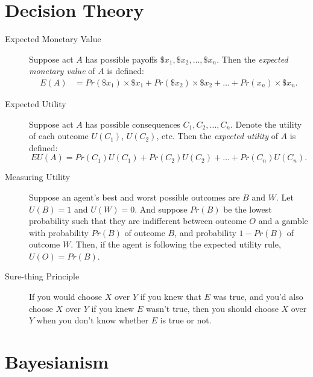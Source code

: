 \documentclass[justified]{tufte-book}
\renewcommand{\u}{U}
\newcommand{\p}{Pr}
\newcommand{\E}{E}
\newcommand{\EU}{EU}
\theoremstyle{definition}
\theoremstyle{definition}
\theoremstyle{definition}
\theoremstyle{remark}
\begin{document}
\hypertarget{decision-theory}{%
\section*{Decision Theory}\label{decision-theory}}

\begin{description}
\item[Expected Monetary Value]
Suppose act \(A\) has possible payoffs \(\$x_1, \$x_2, \ldots, \$x_n\).
Then the \emph{expected monetary value} of \(A\) is defined: \[
  \begin{aligned}
\E(A) &= \p(\$x_1) \times \$x_1 + \p(\$x_2) \times \$x_2 + \ldots + \p(x_n) \times \$x_n.
  \end{aligned}
\]
\item[Expected Utility]
Suppose act \(A\) has possible consequences \(C_1, C_2, \ldots,C_n\).
Denote the utility of each outcome \(U(C_1)\), \(U(C_2)\), etc. Then the
\emph{expected utility} of \(A\) is defined:
\[ \EU(A) = \p(C_1)\u(C_1) + \p(C_2)\u(C_2) + \ldots + \p(C_n)\u(C_n). \]
\item[Measuring Utility]
Suppose an agent's best and worst possible outcomes are \(B\) and \(W\).
Let \(\u(B) = 1\) and \(\u(W) = 0\). And suppose \(\p(B)\) be the lowest
probability such that they are indifferent between outcome \(O\) and a
gamble with probability \(\p(B)\) of outcome \(B\), and probability
\(1 - \p(B)\) of outcome \(W\). Then, if the agent is following the
expected utility rule, \(\u(O) = \p(B)\).
\item[Sure-thing Principle]
If you would choose \(X\) over \(Y\) if you knew that \(E\) was true,
and you'd also choose \(X\) over \(Y\) if you knew \(E\) wasn't true,
then you should choose \(X\) over \(Y\) when you don't know whether
\(E\) is true or not.
\end{description}

\hypertarget{bayesianism-1}{%
\section*{Bayesianism}\label{bayesianism-1}}
\end{document}
